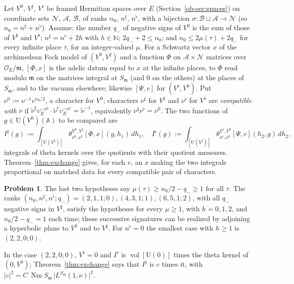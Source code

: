 \documentclass[reqno]{amsart}
\theoremstyle{definition}
\newtheorem{problem}{Problem}[section]
\theoremstyle{plain}
\newcommand{\A}{\mathbb A}
\newcommand{\Oc}{\mathcal O}
\newcommand{\Nm}{\operatorname{Nm}}
\newcommand{\vol}{\operatorname{vol}}
\newcommand{\U}{\mathrm{U}}
\newcommand{\Vs}{V^\sharp}
\newcommand{\Vb}{V^\flat}
\newcommand{\ns}{n^\sharp}
\newcommand{\nb}{n^\flat}
\begin{document}
Let \(V^0\), \(\Vs\), \(\Vb\) be framed Hermitian spaces over \(E\) (Section~\ref{ob-sec:spaces}) on coordinate sets \(\mathcal N\), \(\mathcal A\), \(\mathcal B\), of ranks \(n_0\), \(\ns\), \(\nb\), with a bijection \(\sigma\colon \mathcal B \sqcup \mathcal A \to \mathcal N\) (so \(n_0 = \ns + \nb\)).  Assume: the number \(q_-\) of negative signs of \(V^0\) is the sum of those of \(\Vs\) and \(\Vb\); \(\ns = \nb + 2h\) with \(h \in \mathbb N\); \(2q_- + 2 \le n_0\); and \(n_0 \le 2\mu(\tau) + 2q_-\) for every infinite place \(\tau\), for an integer-valued \(\mu\).  For a Schwartz vector \(x\) of the archimedean Fock model of \((V^0, \Vs)\) and a function \(\Phi\) on \(\mathcal A \times \mathcal N\) matrices over \(\Oc_E/\mathfrak m\), \([\Phi, x]\) is the adelic datum equal to \(x\) at the infinite places, to \(\Phi\) read modulo \(\mathfrak m\) on the matrices integral at \(S_{\mathfrak m}\) (and \(0\) on the others) at the places of \(S_{\mathfrak m}\), and to the vacuum elsewhere; likewise \([\Psi, v]\) for \((\Vb, V^0)\).  Put \(\nu^0 := \nu^{-1}\upsilon^{n_0/2}\), a character for \(V^0\); characters \(\nu^\sharp\) for \(\Vs\) and \(\nu^\flat\) for \(\Vb\) are \emph{compatible with} \(\nu\) if \(\tilde\nu^\sharp\upsilon_E^{-\ns}\cdot\tilde\nu^\flat\upsilon_E^{-\nb} = \tilde\nu^{-1}\), equivalently \(\nu^\sharp\nu^\flat = \nu^0\).  The two functions of \(g \in \U(V^0)(\A)\) to be compared are
\[
  I^\sharp(g) := \int_{[\U(\Vs)]}\theta^{V^0,\Vs}_{\nu^0,\nu^\sharp}[\Phi, x](g, h_1)\,dh_1, \quad
  I^\flat(g) := \int_{[\U(\Vb)]}\theta^{\Vb,V^0}_{\nu^\flat,\nu^0}[\Psi, v](h_2, g)\,dh_2,
\]
integrals of theta kernels over the quotients with their quotient measures.  Theorem~\ref{thm:exchange} gives, for each \(v\), an \(x\) making the two integrals proportional on matched data for every compatible pair of characters.

\begin{problem}\label{pr:hyp}
The last two hypotheses say \(\mu(\tau) \ge n_0/2 - q_- \ge 1\) for all \(\tau\).  The ranks \((n_0, \ns, \nb; q_-) = (2,1,1;0), (4,3,1;1), (6,5,1;2)\), with all \(q_-\) negative signs in \(\Vs\), satisfy the hypotheses for every \(\mu \ge 1\), with \(h = 0, 1, 2\), and \(n_0/2 - q_- = 1\) each time; these successive signatures can be realized by adjoining a hyperbolic plane to \(V^0\) and to \(\Vs\).  For \(\nb = 0\) the smallest case with \(h \ge 1\) is \((2,2,0;0)\).
\end{problem}

In the case \((2,2,0;0)\), \(\Vb = 0\) and \(I^\flat\) is \(\vol[\U(0)]\) times the theta kernel of \((0, V^0)\); Theorem~\ref{thm:exchange} says that \(I^\sharp\) is \(c\) times it, with \(\lvert c\rvert^2 = C\,\Nm S_{\mathfrak m}\,\lvert L^{S_{\mathfrak m}}(1,\nu)\rvert^2\).
\end{document}
